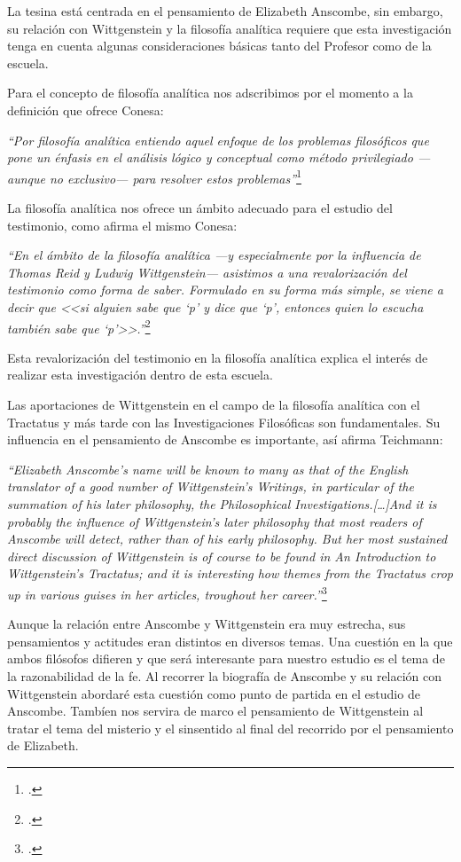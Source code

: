 \documentclass[11pt]{article}
\begin{document}
La tesina está centrada en el pensamiento de Elizabeth Anscombe, sin embargo, su relación con Wittgenstein y la filosofía analítica requiere que esta investigación tenga en cuenta algunas consideraciones básicas tanto del Profesor como de la escuela.

Para el concepto de filosofía analítica nos adscribimos por el momento a la definición que ofrece Conesa:

\emph{
``Por filosofía analítica entiendo aquel enfoque de los problemas filosóficos que pone un énfasis en el análisis lógico y conceptual como método privilegiado \mbox{---aunque} no \mbox{exclusivo---} para resolver estos problemas''}\footcite[16]{cyc}

La filosofía analítica nos ofrece un ámbito adecuado para el estudio del testimonio, como afirma el mismo Conesa:

\emph{
``En el ámbito de la filosofía analítica ---y especialmente por la influencia de Thomas Reid y Ludwig Wittgenstein--- asistimos a una revalorización del testimonio como forma de saber. Formulado en su forma más simple, se viene a decir que <<si alguien sabe que `p' y dice que `p', entonces quien lo escucha también sabe que `p'>>.''}\footcite[487]{feylogicaconesa}

Esta revalorización del testimonio en la filosofía analítica explica el interés de realizar esta investigación dentro de esta escuela. 

Las aportaciones de Wittgenstein en el campo de la filosofía analítica con el Tractatus y más tarde con las Investigaciones Filosóficas son fundamentales. Su influencia en el pensamiento de Anscombe es importante, así afirma Teichmann:

\emph{
``Elizabeth Anscombe's name will be known to many as that of the English translator of a good number of Wittgenstein's Writings, in particular of the summation of his later philosophy, the Philosophical Investigations.[\ldots]And it is probably the influence of Wittgenstein's later philosophy that most readers of Anscombe will detect, rather than of his early philosophy. But her most sustained direct discussion of Wittgenstein is of course to be found in An Introduction to Wittgenstein's Tractatus; and it is interesting how themes from the Tractatus crop up in various guises in her articles, troughout her career.''}\footcite[191]{teichmann}

Aunque la relación entre Anscombe y Wittgenstein era muy estrecha, sus pensamientos y actitudes eran distintos en diversos temas. Una cuestión en la que ambos filósofos difieren y que será interesante para nuestro estudio es el tema de la razonabilidad de la fe. Al recorrer la biografía de Anscombe y su relación con Wittgenstein abordaré esta cuestión como punto de partida en el estudio de Anscombe. Tambíen nos servira de marco el pensamiento de Wittgenstein al tratar el tema del misterio y el sinsentido al final del recorrido por el pensamiento de Elizabeth.
\end{document}
